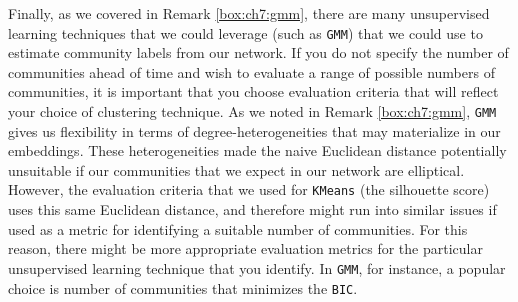 Finally, as we covered in Remark \ref{box:ch7:gmm}, there are many unsupervised learning techniques that we could leverage (such as \texttt{GMM}) that we could use to estimate community labels from our network. If you do not specify the number of communities ahead of time and wish to evaluate a range of possible numbers of communities, it is important that you choose evaluation criteria that will reflect your choice of clustering technique. As we noted in Remark \ref{box:ch7:gmm}, \texttt{GMM} gives us flexibility in terms of degree-heterogeneities that may materialize in our embeddings. These heterogeneities made the naive Euclidean distance potentially unsuitable if our communities that we expect in our network are elliptical. However, the evaluation criteria that we used for \texttt{KMeans} (the silhouette score) uses this same Euclidean distance, and therefore might run into similar issues if used as a metric for identifying a suitable number of communities. For this reason, there might be more appropriate evaluation metrics for the particular unsupervised learning technique that you identify. In \texttt{GMM}, for instance, a popular choice is number of communities that minimizes the \texttt{BIC}.




\newpage